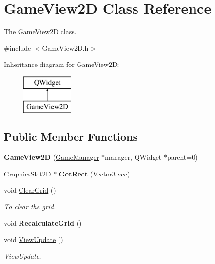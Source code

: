 \hypertarget{classGameView2D}{\section{Game\-View2\-D Class Reference}
\label{classGameView2D}
}


The \hyperlink{classGameView2D}{Game\-View2\-D} class.  




{\ttfamily \#include $<$Game\-View2\-D.\-h$>$}

Inheritance diagram for Game\-View2\-D\-:\begin{figure}[H]
\begin{center}
\leavevmode
\includegraphics[height=2.000000cm]{classGameView2D}
\end{center}
\end{figure}
\subsection*{Public Member Functions}
\begin{DoxyCompactItemize}
\item 
\hypertarget{classGameView2D_ade0d3e85d2385f952db7a5a72dcc34e3}{{\bfseries Game\-View2\-D} (\hyperlink{classGameManager}{Game\-Manager} $\ast$manager, Q\-Widget $\ast$parent=0)}\label{classGameView2D_ade0d3e85d2385f952db7a5a72dcc34e3}

\item 
\hypertarget{classGameView2D_a2599584223096c30f37ed12566ccea32}{\hyperlink{classGraphicsSlot2D}{Graphics\-Slot2\-D} $\ast$ {\bfseries Get\-Rect} (\hyperlink{structVector3}{Vector3} vec)}\label{classGameView2D_a2599584223096c30f37ed12566ccea32}

\item 
\hypertarget{classGameView2D_aa30c0b87cc0c44a68a9f30b5e9e22ea4}{void \hyperlink{classGameView2D_aa30c0b87cc0c44a68a9f30b5e9e22ea4}{Clear\-Grid} ()}\label{classGameView2D_aa30c0b87cc0c44a68a9f30b5e9e22ea4}

\begin{DoxyCompactList}\small\item\em To clear the grid. \end{DoxyCompactList}\item 
\hypertarget{classGameView2D_aaf46ebd46da445c65fb1d54e805b7d9c}{void {\bfseries Recalculate\-Grid} ()}\label{classGameView2D_aaf46ebd46da445c65fb1d54e805b7d9c}

\item 
\hypertarget{classGameView2D_ad826ed1dccdcae1508693615e20df95e}{void \hyperlink{classGameView2D_ad826ed1dccdcae1508693615e20df95e}{View\-Update} ()}\label{classGameView2D_ad826ed1dccdcae1508693615e20df95e}

\begin{DoxyCompactList}\small\item\em View\-Update. \end{DoxyCompactList}\end{DoxyCompactItemize}


